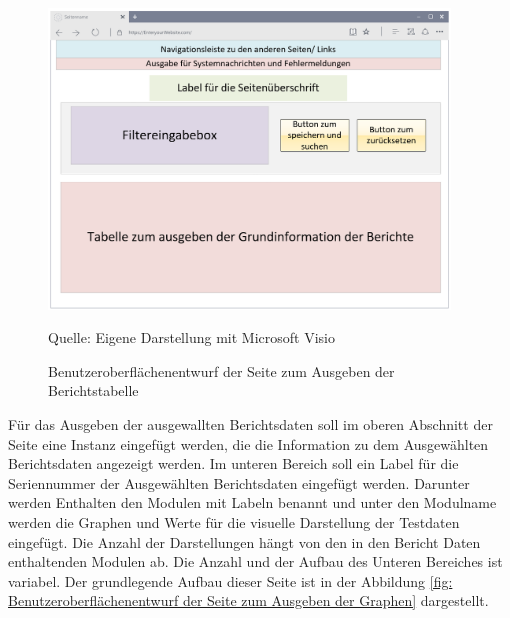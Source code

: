 \begin{figure}[H]
    \centering
    \includegraphics[width=0.95\textwidth]{Grafiken/Overlay_Tabellenseite}
    \caption{Benutzeroberflächenentwurf der Seite zum Ausgeben der Berichtstabelle}
    \label{fig: Benutzeroberflächenentwurf der Seite zum Ausgeben der Berichtstabelle}
    {Quelle: Eigene Darstellung mit Microsoft Visio}
\end{figure}

Für das Ausgeben der ausgewallten Berichtsdaten soll im oberen Abschnitt der Seite eine Instanz
eingefügt werden, die die Information zu dem Ausgewählten Berichtsdaten angezeigt werden.
Im unteren Bereich soll ein Label für die Seriennummer der Ausgewählten Berichtsdaten eingefügt
werden. Darunter werden Enthalten den Modulen mit Labeln benannt und unter den Modulname werden
die Graphen und Werte für die visuelle Darstellung der Testdaten eingefügt. Die Anzahl der Darstellungen
hängt von den in den Bericht Daten enthaltenden Modulen ab. Die Anzahl und der Aufbau des Unteren
Bereiches ist variabel. Der grundlegende Aufbau dieser Seite ist in der Abbildung \ref{fig: Benutzeroberflächenentwurf der Seite zum Ausgeben der Graphen} dargestellt.

